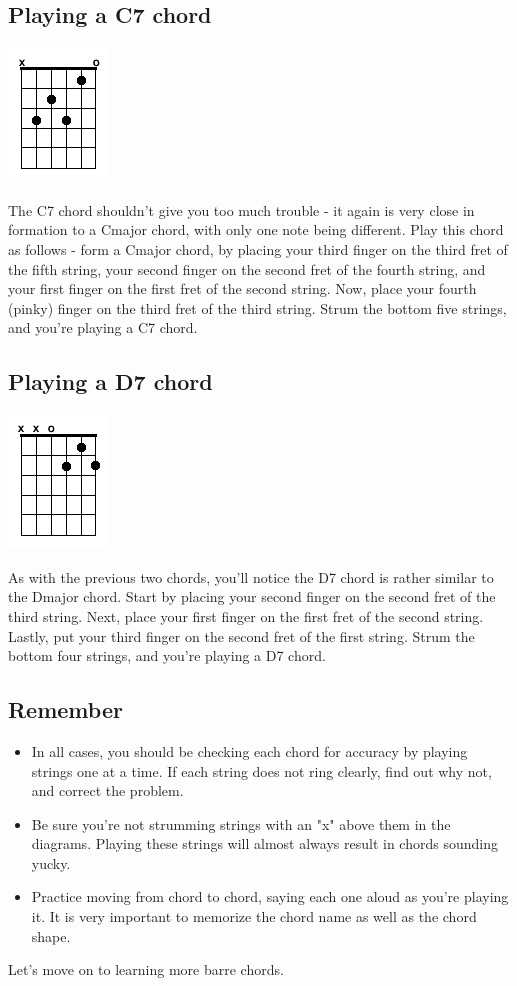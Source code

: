 \subsection{Playing a C7 chord}
\includegraphics{partsix/openc7.png}

The C7 chord shouldn't give you too much trouble - it again is very close in formation to a Cmajor chord, with only one note being different. Play this chord as follows - form a Cmajor chord, by placing your third finger on the third fret of the fifth string, your second finger on the second fret of the fourth string, and your first finger on the first fret of the second string. Now, place your fourth (pinky) finger on the third fret of the third string. Strum the bottom five strings, and you're playing a C7 chord.

\subsection{Playing a D7 chord}
\includegraphics{partsix/opend7.png}

As with the previous two chords, you'll notice the D7 chord is rather similar to the Dmajor chord. Start by placing your second finger on the second fret of the third string. Next, place your first finger on the first fret of the second string. Lastly, put your third finger on the second fret of the first string. Strum the bottom four strings, and you're playing a D7 chord.

\subsection{Remember}
\begin{itemize}
\item In all cases, you should be checking each chord for accuracy by playing strings one at a time. If each string does not ring clearly, find out why not, and correct the problem.
\item Be sure you're not strumming strings with an "x" above them in the diagrams. Playing these strings will almost always result in chords sounding yucky.
\item Practice moving from chord to chord, saying each one aloud as you're playing it. It is very important to memorize the chord name as well as the chord shape.
\end{itemize}
Let's move on to learning more barre chords.

